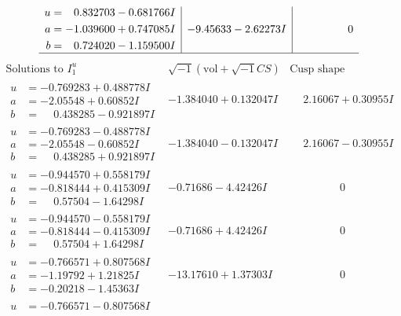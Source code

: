 \documentclass[1p]{elsarticle_modified}
\theoremstyle{definition}
\newcommand{\I}{\sqrt{-1}}
\begin{document}
$$\begin{array}{c|c|c}
\begin{aligned}
u &= \phantom{-}0.832703 - 0.681766 I \\
a &= -1.039600 + 0.747085 I \\
b &= \phantom{-}0.724020 - 1.159500 I\end{aligned}
 & -9.45633 - 2.62273 I & \phantom{-0.000000 } 0\\
 \hline 
 \end{array}$$\newpage$$\begin{array}{c|c|c}  
\text{Solutions to }I^u_{1}& \I (\text{vol} + \sqrt{-1}CS) & \text{Cusp shape}\\
 \hline 
\begin{aligned}
u &= -0.769283 + 0.488778 I \\
a &= -2.05548 + 0.60852 I \\
b &= \phantom{-}0.438285 - 0.921897 I\end{aligned}
 & -1.384040 + 0.132047 I & \phantom{-}2.16067 + 0.30955 I \\ \hline\begin{aligned}
u &= -0.769283 - 0.488778 I \\
a &= -2.05548 - 0.60852 I \\
b &= \phantom{-}0.438285 + 0.921897 I\end{aligned}
 & -1.384040 - 0.132047 I & \phantom{-}2.16067 - 0.30955 I \\ \hline\begin{aligned}
u &= -0.944570 + 0.558179 I \\
a &= -0.818444 + 0.415309 I \\
b &= \phantom{-}0.57504 - 1.64298 I\end{aligned}
 & -0.71686 - 4.42426 I & \phantom{-0.000000 } 0 \\ \hline\begin{aligned}
u &= -0.944570 - 0.558179 I \\
a &= -0.818444 - 0.415309 I \\
b &= \phantom{-}0.57504 + 1.64298 I\end{aligned}
 & -0.71686 + 4.42426 I & \phantom{-0.000000 } 0 \\ \hline\begin{aligned}
u &= -0.766571 + 0.807568 I \\
a &= -1.19792 + 1.21825 I \\
b &= -0.20218 - 1.45363 I\end{aligned}
 & -13.17610 + 1.37303 I & \phantom{-0.000000 } 0 \\ \hline\begin{aligned}
u &= -0.766571 - 0.807568 I \\

\end{aligned}
\end{array}$$
\end{document}
